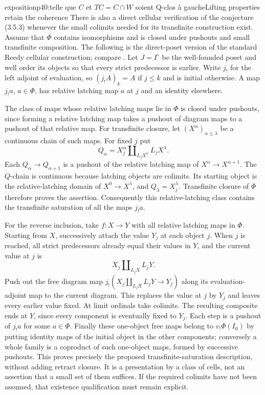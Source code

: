 \begin{dcomment}{exposition}{p40:telle que $C$ et $TC=C\cap W$ soient Q-clos à gauche}{Lifting properties retain the coherence}
There is also a direct cellular verification of the conjecture (3.5.3) whenever the small colimits needed for its transfinite construction exist. Assume that $\Phi$ contains isomorphisms and is closed under pushouts and small transfinite composition. The following is the direct-poset version of the standard Reedy cellular construction; compare \citet[Proposition~6.3 and Corollary~6.7]{RiehlVerity2014Reedy}. Let $J=I^\circ$ be the well-founded poset and well order its objects so that every strict predecessor is earlier. Write $j_!$ for the left adjoint of evaluation, so $(j_!A)_k=A$ if $j\leq k$ and is initial otherwise. A map $j_!a$, $a\in\Phi$, has relative latching map $a$ at $j$ and an identity elsewhere.

The class of maps whose relative latching maps lie in $\Phi$ is closed under pushouts, since forming a relative latching map takes a pushout of diagram maps to a pushout of that relative map. For transfinite closure, let $(X^\alpha)_{\alpha\leq\lambda}$ be a continuous chain of such maps. For fixed $j$ put
\[
 Q_\alpha=X^\alpha_j\amalg_{L_jX^\alpha}L_jX^\lambda.
\]
Each $Q_\alpha\to Q_{\alpha+1}$ is a pushout of the relative latching map of $X^\alpha\to X^{\alpha+1}$. The $Q$-chain is continuous because latching objects are colimits. Its starting object is the relative-latching domain of $X^0\to X^\lambda$, and $Q_\lambda=X^\lambda_j$. Transfinite closure of $\Phi$ therefore proves the assertion. Consequently this relative-latching class contains the transfinite saturation of all the maps $j_!a$.

For the reverse inclusion, take $f:X\to Y$ with all relative latching maps in $\Phi$. Starting from $X$, successively attach the value $Y_j$ at each object $j$. When $j$ is reached, all strict predecessors already equal their values in $Y$, and the current value at $j$ is
\[
 X_j\amalg_{L_jX}L_jY.
\]
Push out the free diagram map $j_!(X_j\amalg_{L_jX}L_jY\to Y_j)$ along its evaluation-adjoint map to the current diagram. This replaces the value at $j$ by $Y_j$ and leaves every earlier value fixed. At limit ordinals take colimits. The resulting composite ends at $Y$, since every component is eventually fixed to $Y_j$. Each step is a pushout of $j_!a$ for some $a\in\Phi$. Finally these one-object free maps belong to $v_!\Phi(I_0)$ by putting identity maps of the initial object in the other components; conversely a whole family is a coproduct of such one-object maps, formed by successive pushouts. This proves precisely the proposed transfinite-saturation description, without adding retract closure. It is a presentation by a class of cells, not an assertion that a small set of them suffices. If the required colimits have not been assumed, that existence qualification must remain explicit.


\end{dcomment}

